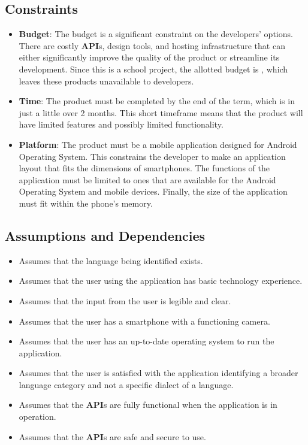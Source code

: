 
\subsection{Constraints}
\label{sub:constraints}
\begin{itemize}
	\item \textbf{Budget}: The budget is a significant constraint on the developers' options. There are costly \textbf{API}s, design tools, and hosting infrastructure that can either significantly improve the quality of the product or streamline its development. Since this is a school project, the allotted budget is , which leaves these products unavailable to developers.
	\item \textbf{Time}: The product must be completed by the end of the term, which is in just a little over 2 months. This short timeframe means that the product will have limited features and possibly limited functionality.
	\item \textbf{Platform}: The product must be a mobile application designed for Android Operating System. This constrains the developer to make an application layout that fits the dimensions of smartphones. The functions of the application must be limited to ones that are available for the Android Operating System and mobile devices. Finally, the size of the application must fit within the phone's memory.
\end{itemize}


\subsection{Assumptions and Dependencies}
\label{sub:assumptions_and_dependencies}
\begin{itemize}
	\item Assumes that the language being identified exists.
	\item Assumes that the user using the application has basic technology experience.
	\item Assumes that the input from the user is legible and clear.
	\item Assumes that the user has a smartphone with a functioning camera.
	\item Assumes that the user has an up-to-date operating system to run the application.
	\item Assumes that the user is satisfied with the application identifying a broader language category and not a specific dialect of a language.
	\item Assumes that the \textbf{API}s are fully functional when the application is in operation.
	\item Assumes that the \textbf{API}s are safe and secure to use.
\end{itemize}




